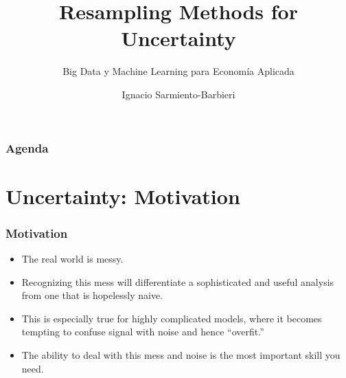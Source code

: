 \documentclass[
  shownotes,
  xcolor={svgnames},
  hyperref={colorlinks,citecolor=DarkBlue,linkcolor=andesred,urlcolor=DarkBlue}
  , aspectratio=169]{beamer}
\begin{document}
\title{Resampling Methods for Uncertainty}
\subtitle{Big Data y Machine Learning para Economía Aplicada}
\date{}

\author[Sarmiento-Barbieri]{Ignacio Sarmiento-Barbieri}


\begin{frame}[noframenumbering]
\maketitle
\end{frame}


\begin{frame}
\frametitle{Agenda}

\tableofcontents


\end{frame}

\section{Uncertainty: Motivation}

\begin{frame}
\frametitle{Motivation}

\begin{itemize}
  \item The real world is messy. 
  \medskip
  \item Recognizing this mess will differentiate a sophisticated and useful analysis from one that is hopelessly naive. 
  \medskip
  \item This is especially true for highly complicated models, where it becomes tempting to confuse signal with noise and hence “overfit.” 
  \medskip
  \item The ability to deal with this mess and noise is the most important skill you need.
\end{itemize}
\end{frame}


\end{document}
